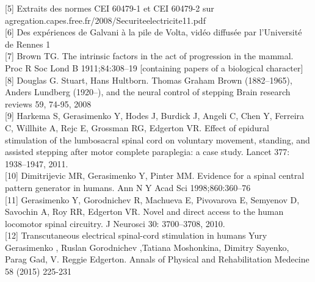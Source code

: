 \documentclass{report}
\begin{document}
[5] Extraits des normes CEI 60479-1 et CEI 60479-2 sur agregation.capes.free.fr/2008/Securiteelectricite11.pdf\\

[6] Des exp\'eriences de Galvani \`a la pile de Volta, vid\'eo diffus\'ee par l'Universit\'e de Rennes 1\\


[7] Brown TG. The intrinsic factors in the act of progression in the mammal. Proc R Soc Lond B 1911;84:308–19
[containing papers of a biological character] \\

[8] Douglas G. Stuart, Hans Hultborn. Thomas Graham Brown (1882–1965), Anders Lundberg (1920–), and the neural control 
of stepping Brain research reviews 59, 74-95, 2008 \\

[9] Harkema S, Gerasimenko Y, Hodes J, Burdick J, Angeli C, Chen Y, Ferreira C, Willhite A, Rejc E, Grossman RG, 
Edgerton VR. Effect of epidural stimulation of the lumbosacral spinal cord on voluntary movement, standing, and 
assisted 
stepping after motor complete paraplegia: a case study. Lancet 377: 1938–1947, 2011. \\

[10] Dimitrijevic MR, Gerasimenko Y, Pinter MM. Evidence for a spinal central pattern generator in humans. Ann N Y Acad 
Sci 1998;860:360–76  \\

[11] Gerasimenko Y, Gorodnichev R, Machueva E, Pivovarova E, Semyenov D, Savochin A, Roy RR, Edgerton VR. Novel and 
direct access to the human locomotor spinal circuitry. J Neurosci 30: 3700–3708, 2010.  \\

[12] Transcutaneous electrical spinal-cord stimulation in humans 
Yury Gerasimenko , Ruslan  Gorodnichev ,Tatiana Moshonkina, Dimitry Sayenko,  Parag Gad, V. Reggie Edgerton. Annals of 
Physical and Rehabilitation Medecine 58 (2015) 225-231
\end{document}
